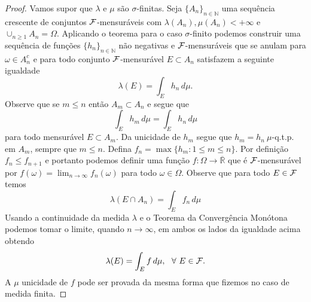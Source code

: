 \begin{proof}
Vamos supor que $\lambda$ e $\mu$ são 
$\sigma$-finitas. Seja $\{A_n\}_{n\in\mathbb{N}}$
uma sequência crescente de conjuntos $\mathcal{F}$-mensuráveis com
$\lambda(A_n),\mu(A_n)<+\infty$ e 
$\cup_{n\geq 1}A_n =\Omega$.
Aplicando o teorema para o caso $\sigma$-finito
podemos construir uma sequência de funções 
$\{h_n\}_{n\in\mathbb{N}}$ não negativas e 
$\mathcal{F}$-mensuráveis que se anulam 
para $\omega\in A^c_n$ e para todo 
conjunto $\mathcal{F}$-mensurável $E\subset A_n$
satisfazem a seguinte igualdade
\[
\lambda(E) = \int_E h_n\, d\mu.
\]
Observe que se $m\leq n$ então $A_m\subset A_n$
e segue que 
\[
\int_E h_m\, d\mu
=
\int_E h_n\, d\mu
\]
para todo mensurável $E\subset A_m$.
Da unicidade de $h_m$ segue que 
$h_m=h_n\ \mu$-q.t.p. em $A_m$, 
sempre que $m\leq n$.
Defina $f_n=\max\{h_m: 1\leq m\leq n\}$.
Por definição $f_n\leq f_{n+1}$ e portanto 
podemos definir uma função $f:\Omega\to\overline{\mathbb{R}}$ 
que é $\mathcal{F}$-mensurável 
por $f(\omega) =\lim_{n\to\infty} f_n(\omega)$
para todo $\omega\in\Omega$. Observe que
para todo $E\in\mathcal{F}$ temos 
\[
\lambda(E\cap A_n) = \int_{E} f_n\, d\mu
\]
Usando a continuidade da medida $\lambda$
e o Teorema da Convergência Monótona 
podemos tomar o limite, quando $n\to\infty$,
em ambos os lados da igualdade acima obtendo
\[
\lambda(E) = \int_{E} f\, d\mu,
\ \ \forall \ E\in\mathcal{F}.
\]
A $\mu$ unicidade de $f$ pode ser provada da mesma
forma que fizemos no caso de medida finita.
\end{proof}
